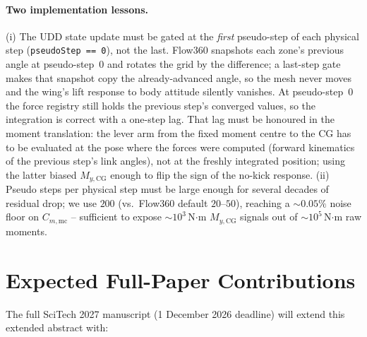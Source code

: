 \documentclass[conf]{new-aiaa}
\begin{document}
\paragraph{Two implementation lessons.}
(i) The UDD state update must be gated at the \emph{first}
pseudo-step of each physical step (\texttt{pseudoStep == 0}),
not the last.  Flow360 snapshots each zone's previous angle at
pseudo-step~0 and rotates the grid by the difference; a
last-step gate makes that snapshot copy the already-advanced
angle, so the mesh never moves and the wing's lift response to
body attitude silently vanishes.  At pseudo-step~0 the force
registry still holds the previous step's converged values, so
the integration is correct with a one-step lag.  That lag must
be honoured in the moment translation: the lever arm from the
fixed moment centre to the CG has to be evaluated at the pose
where the forces were computed (forward kinematics of the
previous step's link angles), not at the freshly integrated
position; using the latter biased $M_{y,\mathrm{CG}}$ enough to
flip the sign of the no-kick response.  (ii) Pseudo
steps per physical step must be large enough for several
decades of residual drop; we use $200$ (vs.\ Flow360 default
$20$--$50$), reaching a $\sim 0.05\%$ noise floor on
$C_{m,\mathrm{mc}}$ -- sufficient to expose $\sim 10^3\,$N$\cdot$m
$M_{y,\mathrm{CG}}$ signals out of $\sim 10^5\,$N$\cdot$m raw
moments.

\section{Expected Full-Paper Contributions}
\label{sec:expected}

The full SciTech 2027 manuscript (1 December 2026 deadline)
will extend this extended abstract with:
\end{document}
